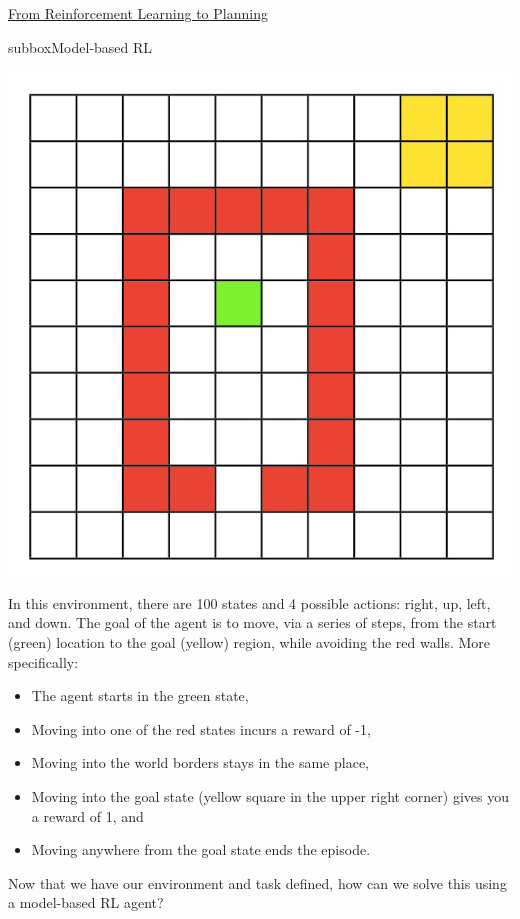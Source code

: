 \begin{textbox}{\href{https://compneuro.neuromatch.io/tutorials/W3D4_ReinforcementLearning/student/W3D4_Tutorial4.html}{From Reinforcement Learning to Planning } }
\begin{subbox}{subbox}{Model-based RL}
\begin{center}
\includegraphics[scale=0.14]{Figures/RL/RL_Figure16.png}
\end{center}
In this environment, there are 100 states and 4 possible actions: right, up, left, and down. The goal of the agent is to move, via a series of steps, from the start (green) location to the goal (yellow) region, while avoiding the red walls. More specifically:
\begin{itemize}
    \item 
 The agent starts in the green state,
\item Moving into one of the red states incurs a reward of -1,
\item Moving into the world borders stays in the same place,
\item Moving into the goal state (yellow square in the upper right corner) gives you a reward of 1, and
\item Moving anywhere from the goal state ends the episode.
\end{itemize}

Now that we have our environment and task defined, how can we solve this using a model-based RL agent?

\end{subbox}

\end{textbox}
